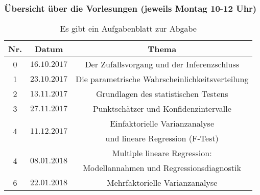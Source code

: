 \documentclass[usenames,dvipsnames,handout]{beamer}
\begin{document}
 \begin{frame}
 \frametitle{Übersicht über die Vorlesungen (jeweils Montag 10-12 Uhr)}%
    \begin{table}
\begin{center}
\caption{\colorbox{yellow!40}{Es gibt ein Aufgabenblatt zur Abgabe}}
  \begin{tabular}{|c|c|c|}
    \hline
    Nr. & Datum & Thema \\ \hline
    0 &   $ 16.10.2017$   &  \colorbox{blue!10}{  Der Zufallsvorgang und der Inferenzschluss}   \\ \hline
    \colorbox{yellow!40}{1} &  $23.10.2017$  &   \colorbox{blue!10}{Die parametrische  Wahrscheinlichkeitsverteilung } \\ \hline
    \colorbox{yellow!40}{2} &   $13.11.2017$   &   \colorbox{green!40}{Grundlagen des statistischen Testens}\\ \hline
    \colorbox{yellow!40}{3} &   $27.11.2017$   &   \colorbox{green!40}{Punktschätzer und Konfidenzintervalle }\\ \hline
  \multirow{2}{*}{\colorbox{yellow!40}{4}} &  \multirow{2}{*}{$11.12.2017$}& \colorbox{violet!40}{Einfaktorielle
  Varianzanalyse} \\ %
                   &        & \colorbox{violet!40}{und lineare Regression (F-Test)}\\ \hline  
                   \multirow{2}{*}{\colorbox{yellow!40}{4}} &  \multirow{2}{*}{$08.01.2018$}& \colorbox{violet!40}{Multiple lineare Regression:} \\ %
                   &        & \colorbox{violet!40}{Modellannahmen und Regressionsdiagnostik}\\ \hline 
    6 &   $22.01.2018$     &  \colorbox{violet!40}{Mehrfaktorielle Varianzanalyse} \\ \hline
  \end{tabular}
  \end{center}
  \label{tab:multicol}
  \end{table}
\end{frame}
\end{document}
